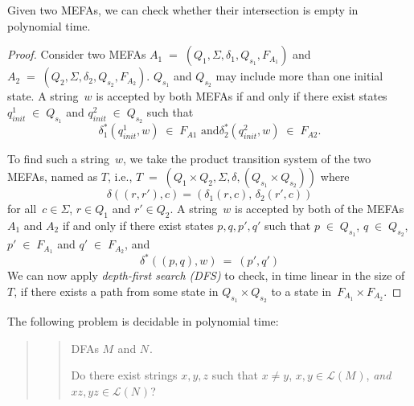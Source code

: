 \documentclass{lmcs} %
\theoremstyle{plain}\newtheorem{satz}[thm]{Satz} %
\begin{document}
\begin{appendices}
\begin{lem}{\label{MEFAIntersection}}
Given two MEFAs, we can check whether their intersection is empty in polynomial time.
\end{lem}

\begin{proof}
Consider two MEFAs $A_1^{} \; = \; (Q_1^{}, \Sigma, \delta_1^{},
Q_{s_1}^{}, F_{A_1}^{})$ and $A_2^{} \; = \; (Q_2^{}, \Sigma,
\delta_2^{}, Q_{s_2}^{}, F_{A_2}^{})$. $Q_{s_1}^{}$ and
$Q_{s_2}^{}$ may include more than one initial state.
A string~$w$ is accepted by both MEFAs if and only if
there exist states 
$q_{init}^1 \; \in \; Q_{s_1}^{}$ and
$q_{init}^2 \; \in \; Q_{s_2}^{}$ such that
$$\delta_1^*( q_{init}^1 , w ) \; \in \; F_{A1}^{} \text{ and}
\delta_2^*( q_{init}^2 , w ) \; \in \; F_{A2}^{}.$$

To find such a string~$w$, we take the product transition system of the
two MEFAs, named as $T$, i.e., $T \; = \; (Q_1^{} \times Q_2^{},
\Sigma, \delta, (Q_{s_1}^{} \times Q_{s_2}^{}))$ where
\[ \delta((r, r'), c) = (
\delta_1^{}(r, c) , \, \delta_2^{}(r', c) ) \] for all~$c \in \Sigma$,
$r \in Q_1^{}$ and $r' \in Q_2^{}$.  A
string~$w$ is accepted by both of the MEFAs $A_1^{}$ and $A_2^{}$
if and only if there exist states $p, q, p', q'$ such that
$p \; \in \; Q_{s_1}^{}$, $q \; \in \; Q_{s_2}^{}$,
$p' \; \in \; F_{A_1}$ and $q' \; \in \; F_{A_2}$, and \[ \delta_{}^*((p , q) , w) ~ = ~ (p', q')
\] We can now apply \emph{depth-first search (DFS)} to check, in time
linear in the size of~$T$, 
if there exists a path from some state in $Q_{s_1}^{} \times Q_{s_2}^{}$ to a state 
in~$F_{A_1} \times F_{A_2}$.
\end{proof}

\begin{lem}{\label{FindingStringsThruIntersection}}
The following problem is decidable in polynomial time:

  \begin{quote}
    \begin{quote}
  \begin{description}[align=right]
  \item[{\bf Input}] DFAs $M^{}$ and $N^{}$.\\

  \item[{\bf Question}] Do there exist strings $x, y, z$ such that $x \neq y$,
    $x, y \in \mathcal{L}( M^{} )$, \emph{and}
    \mbox{$xz, yz \in \mathcal{L}( N^{} )$}?
  \end{description}
    \end{quote}
  \end{quote}
\end{lem}


\end{appendices}
\end{document}

